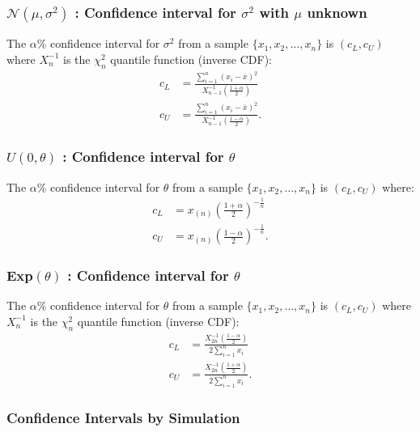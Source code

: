 \documentclass[a4paper, 12pt, twoside]{article}
\begin{document}
\subsubsection{$\mathcal{N}(\mu, \sigma^2)$ : Confidence
    interval for $\sigma^2$ with $\mu$ unknown}

The $\alpha\%$ confidence interval for $\sigma^2$ from a sample
$\{x_1, x_2, \ldots, x_n\}$ is $(c_L, c_U)$ where $X_n^{-1}$ is the
$\chi^2_n$ quantile function (inverse CDF):
\begin{align*}
    c_L & = \frac{\sum_{i = 1}^n(x_i - \overline{x})^2}
    {X_{n-1}^{-1}\left(\frac{1 + \alpha}{2}\right)}     \\
    c_U & = \frac{\sum_{i = 1}^n(x_i - \overline{x})^2}
    {X_{n-1}^{-1}\left(\frac{1 - \alpha}{2}\right)}.
\end{align*}

\subsubsection{$U(0, \theta)$ : Confidence interval for $\theta$}

The $\alpha\%$ confidence interval for $\theta$ from a sample
$\{x_1, x_2, \ldots, x_n\}$ is $(c_L, c_U)$ where:
\begin{align*}
    c_L & = x_{(n)}\left(\frac{1 + \alpha}{2}\right)^{-\frac{1}{n}}  \\
    c_U & = x_{(n)}\left(\frac{1 - \alpha}{2}\right)^{-\frac{1}{n}}.
\end{align*}

\subsubsection{Exp$(\theta)$ : Confidence interval for $\theta$}

The $\alpha\%$ confidence interval for $\theta$ from a sample
$\{x_1, x_2, \ldots, x_n\}$ is $(c_L, c_U)$ where $X_n^{-1}$ is the
$\chi^2_n$ quantile function (inverse CDF):
\begin{align*}
    c_L & = \frac{X_{2n}^{-1}\left(\frac{1 - \alpha}{2}\right)}
    {2\sum_{i = 1}^n x_i}                                       \\
    c_U & = \frac{X_{2n}^{-1}\left(\frac{1 + \alpha}{2}\right)}
    {2\sum_{i = 1}^n x_i}.
\end{align*}

\subsubsection{Confidence Intervals by Simulation}
\end{document}
